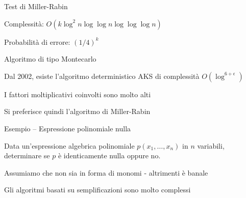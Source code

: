 \begin{frame}{Test di Miller-Rabin}

\vspace{-9pt}
\begin{myboxtitle}[Riassunto]
\BIL
\item Complessità: $O(k \log^2 n \log \log n \log \log \log n)$
\item Probabilità di errore: $(1/4)^k$
\item Algoritmo di tipo Montecarlo
\EIL
\end{myboxtitle}

\begin{myboxtitle}
\BIL
\item Dal 2002, esiste l'algoritmo deterministico AKS di complessità $O(\log^{6+\epsilon})$
\item I fattori moltiplicativi coinvolti sono molto alti
\item Si preferisce quindi l'algoritmo di Miller-Rabin
\EIL
\end{myboxtitle}

\end{frame}

\begin{frame}{Esempio -- Espressione polinomiale nulla}

\vspace{-9pt}
\begin{myboxtitle}[Problema]
Data un’espressione algebrica polinomiale $p(x_1 , \ldots , x_n)$ 
in $n$ variabili, determinare se $p$ è identicamente nulla oppure no.
\end{myboxtitle}

\begin{myboxtitle}[Discussione]
\BIL
\item Assumiamo che non sia in forma di monomi - altrimenti è banale
\item Gli algoritmi basati su semplificazioni sono molto complessi
\EIL
\end{myboxtitle}

\end{frame}


